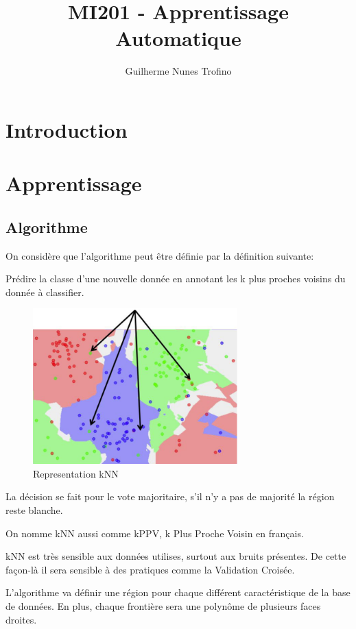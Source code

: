 \documentclass{article}
\title{MI201 - Apprentissage Automatique}
\author{Guilherme Nunes Trofino}
\begin{document}
\maketitle
\setlength{\parindent}{0pt}

\newpage\tableofcontents

\section{Introduction}


\section{Apprentissage}
\subsection{Algorithme}
On considère que l'algorithme peut être définie par la définition suivante:
\begin{definition}
    Prédire la classe d'une nouvelle donnée en annotant les k plus proches voisins du donnée à classifier.
    \begin{figure}[H]
        \centering
        \includegraphics[height=60mm]{images/kNN_diagram.png}
        \caption{Representation kNN}
    \end{figure}
    La décision se fait pour le vote majoritaire, s'il n'y a pas de majorité la région reste blanche. 
\end{definition}
\begin{remark}
    On nomme kNN aussi comme kPPV, k Plus Proche Voisin en français.
\end{remark}
\begin{remark}
    kNN est très sensible aux données utilises, surtout aux bruits présentes. De cette façon-là il sera sensible à des pratiques comme la Validation Croisée.
\end{remark}
L'algorithme va définir une région pour chaque différent caractéristique de la base de données. En plus, chaque frontière sera une polynôme de plusieurs faces droites.\\
\end{document}
